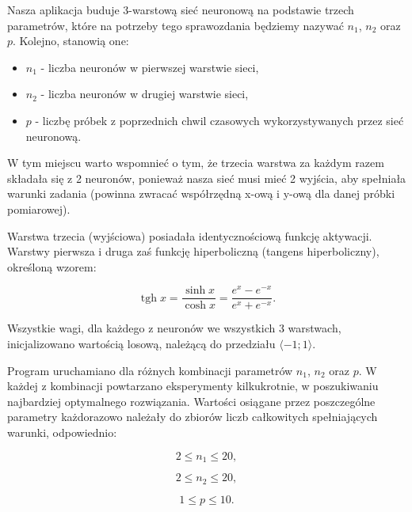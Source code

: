 \documentclass{classrep}
\begin{document}
Nasza aplikacja buduje 3-warstową sieć neuronową na podstawie trzech parametrów, które na potrzeby tego sprawozdania będziemy nazywać $n_1$, $n_2$ oraz $p$. Kolejno, stanowią one:

\begin{itemize}[label=$\bullet$\scshape\bfseries]
\item $n_1$ - liczba neuronów w pierwszej warstwie sieci,
\item $n_2$ - liczba neuronów w drugiej warstwie sieci,
\item $p$ - liczbę próbek z poprzednich chwil czasowych wykorzystywanych przez sieć neuronową.
\end{itemize}

W tym miejscu warto wspomnieć o tym, że trzecia warstwa za każdym razem składała się z 2 neuronów, ponieważ nasza sieć musi mieć 2 wyjścia, aby spełniała warunki zadania (powinna zwracać współrzędną x-ową i y-ową dla danej próbki pomiarowej).\newline

Warstwa trzecia (wyjściowa) posiadała identycznościową funkcję aktywacji. Warstwy pierwsza i druga zaś funkcję hiperboliczną (tangens hiperboliczny), określoną wzorem:

\begin{equation}
\operatorname{tgh} x = \frac{\sinh x}{\cosh x} = \frac{e^x - e^{-x}}{e^x + e^{-x}}.
\end{equation}\newline

Wszystkie wagi, dla każdego z neuronów we wszystkich 3 warstwach, inicjalizowano wartością losową, należącą do przedziału $\langle-1; 1\rangle$.\newline

Program uruchamiano dla różnych kombinacji parametrów $n_1$, $n_2$ oraz $p$. W każdej z kombinacji powtarzano eksperymenty kilkukrotnie, w poszukiwaniu najbardziej optymalnego rozwiązania. Wartości osiągane przez poszczególne parametry każdorazowo należały do zbiorów liczb całkowitych spełniających warunki, odpowiednio:

\begin{equation}
 2 \leq n_1 \leq 20,
\end{equation}

\begin{equation}
 2 \leq n_2 \leq 20,
\end{equation}

\begin{equation}
 1 \leq p \leq 10.
\end{equation}
\end{document}
